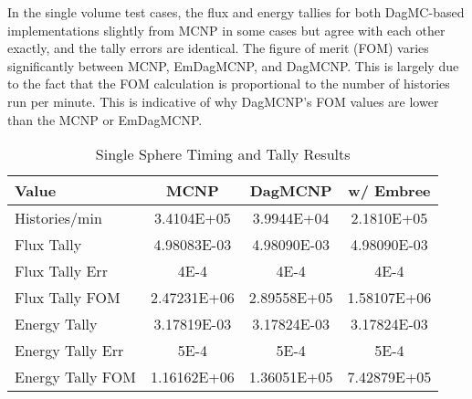 \documentclass{anstrans}
\begin{document}
In the single volume test cases, the flux and energy tallies for both DagMC-based implementations slightly from MCNP in some cases but agree with each other exactly, and the tally errors are identical. The figure of merit (FOM) varies significantly between MCNP, EmDagMCNP, and DagMCNP. This is largely due to the fact that the FOM calculation is proportional to the number of histories run per minute. This is indicative of why DagMCNP's FOM values are lower than the MCNP or EmDagMCNP.

\begin{table}[H]

  \begin{center}
    \caption{Single Sphere Timing and Tally Results}

    \begin{tabular}{lccc}
      \toprule
      Value & MCNP & DagMCNP & w/ Embree \\
      \toprule
      Histories/min & 3.4104E+05  & 3.9944E+04  & 2.1810E+05  \\
      Flux Tally & 4.98083E-03 & 4.98090E-03 & 4.98090E-03 \\
      Flux Tally Err & 4E-4 & 4E-4 & 4E-4  \\
      Flux Tally FOM & 2.47231E+06 & 2.89558E+05 & 1.58107E+06 \\
      Energy Tally & 3.17819E-03 & 3.17824E-03 & 3.17824E-03 \\
      Energy Tally Err & 5E-4 & 5E-4 & 5E-4 \\
      Energy Tally FOM & 1.16162E+06 & 1.36051E+05 & 7.42879E+05 \\      
      \bottomrule
                        
    \end{tabular}


  \end{center}

\end{table}
\end{document}
